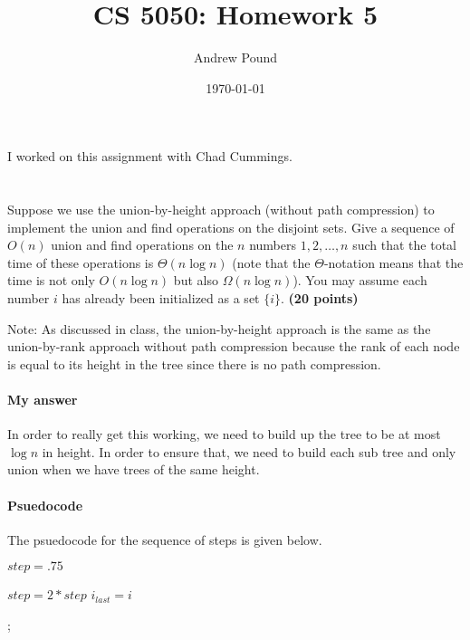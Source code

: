 \documentclass{article}
\title{CS 5050: Homework 5}
\author{Andrew Pound}
\date{\today}
\DeclarePairedDelimiter{\ceil}{\lceil}{\rceil}
\begin{document}
\maketitle

I worked on this assignment with Chad Cummings.
\section{}
 Suppose we use the union-by-height approach (without path
 compression) to implement the union and find operations on the
 disjoint sets. Give a sequence of $O(n)$ union and find operations on
 the $n$ numbers $1,2,\dots,n$ such that the total time of these
 operations is $\Theta(n \log n)$ (note that the $\Theta$-notation
 means  that the time is not only $O(n \log n)$ but also $\Omega(n\log
 n)$). You may assume each number $i$ has already been initialized as
 a set $\{i\}$. {\bf (20 points)}

Note: As discussed in class, the union-by-height approach is the same
as the union-by-rank approach without path compression because the
rank of each node is equal to its height in the tree since there is no
path compression. 

\paragraph{My answer}
In order to really get this working, we need to build up the tree to
be at most $\log n$ in height.  In order to ensure that, we need to
build each sub tree and only union when we have trees of the same
height.




\paragraph{Psuedocode} The psuedocode for the sequence of steps is
given below.


{\singlespacing
\begin{algorithmic}
    \State $step = .75$
         
          \State {}       
        \EndIf  
      \EndFor
      \State  $step = 2*step$    
      \State $i_{last} = i$
    \EndWhile
    
    \State {};
       \State {}
    \EndFor

\end{algorithmic}
}
\end{document}
